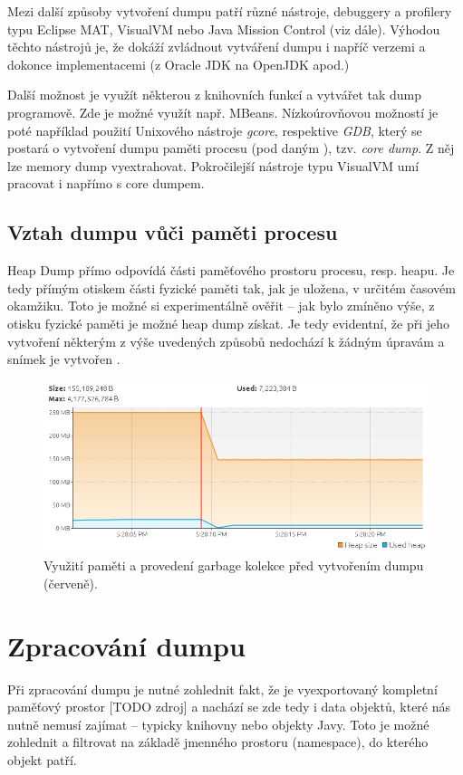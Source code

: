 Mezi další způsoby vytvoření dumpu patří různé nástroje, debuggery a profilery typu Eclipse MAT, VisualVM nebo Java Mission Control (viz dále). Výhodou těchto nástrojů je, že dokáží zvládnout vytváření dumpu i napříč verzemi a dokonce implementacemi (z Oracle JDK na OpenJDK apod.)

Další možnost je využít některou z knihovních funkcí a vytvářet tak dump programově. Zde je možné využít např. MBeans. Nízkoúrovňovou možností je poté například použití Unixového nástroje \textit{gcore}, respektive \textit{GDB}, který se postará o vytvoření dumpu paměti procesu (pod daným ), tzv. \textit{core dump}. Z něj lze memory dump vyextrahovat. Pokročilejší nástroje typu VisualVM umí pracovat i napřímo s core dumpem.

\subsection{Vztah dumpu vůči paměti procesu}
Heap Dump přímo odpovídá části paměťového prostoru procesu, resp. heapu. Je tedy přímým otiskem části fyzické paměti tak, jak je uložena, v určitém časovém okamžiku. Toto je možné si experimentálně ověřit -- jak bylo zmíněno výše, z otisku fyzické paměti je možné heap dump získat. Je tedy evidentní, že při jeho vytvoření některým z výše uvedených způsobů nedochází k žádným úpravám a snímek je vytvořen . 

\begin{figure}[h]
	\centering
	\includegraphics[scale=0.5]{obrazky/heapdump-performed.png}
	\caption{Využití paměti a provedení garbage kolekce před vytvořením dumpu (červeně).}
	\label{obr1}
\end{figure}

\section{Zpracování dumpu}
Při zpracování dumpu je nutné zohlednit fakt, že je vyexportovaný kompletní paměťový prostor [TODO zdroj] a nachází se zde tedy i data objektů, které nás nutně nemusí zajímat – typicky knihovny nebo objekty Javy. Toto je možné zohlednit a filtrovat na základě jmenného prostoru (namespace), do kterého objekt patří.

